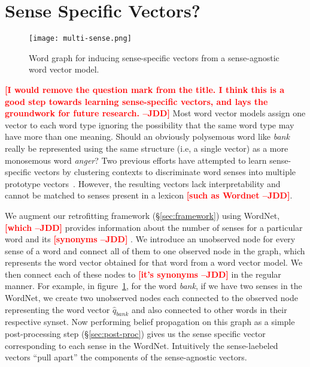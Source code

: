 \documentclass[11pt]{article}
\newcommand{\jdd}[1]{\textcolor{red}{\bf\small [#1 --JDD]}}
\begin{document}
\section{Sense Specific Vectors?}
\label{sec:word-sense}

\begin{figure}[tb]
  \centering
  \texttt{[image: multi-sense.png]}
  \caption{Word graph for inducing sense-specific vectors from a sense-agnostic word vector model.}
  \label{fig:sense-graph}
\end{figure}

\jdd{I would remove the question mark from the title. I think this is a good step towards learning sense-specific vectors, and lays the groundwork for future research.}
Most word vector models assign one vector to each word type
ignoring the possibility that the same word type may have more than one meaning. 
Should an obviously polysemous word like \textit{bank} really be represented using
the same structure (i.e, a single vector) as a more monosemous word \textit{anger}?
Two previous efforts have attempted to learn sense-specific vectors by 
clustering contexts to discriminate
word senses into multiple prototype vectors~\cite{reisinger:naacl10,huang2012improving}. 
However, the resulting vectors
lack interpretability and cannot be matched to senses present in a lexicon \jdd{such as Wordnet}.

We augment our retrofitting framework (\S\ref{sec:framework}) using WordNet, \jdd{which}
 provides information about the number of senses for a particular word
and its \jdd{synonyms} . We introduce an unobserved node for every sense of a 
word and connect all of them to one observed node in the graph, which represents the word
vector obtained for that word from a word vector model. We then connect
each of these nodes to \jdd{it's synonyms} in the regular manner. 
For example, in figure~\ref{fig:sense-graph}, for the word \textit{bank}, 
if we have two senses in the WordNet,
we create two unobserved nodes each connected to the observed node representing
the word vector $\hat{q}_{bank}$ and also connected to other words in their respective 
synset.
Now performing belief propagation on this graph as a simple post-processing step
(\S\ref{sec:post-proc}) gives us the sense specific vector corresponding to each
sense in the WordNet. 
Intuitively the sense-laebeled vectors ``pull apart'' the components of the 
sense-agnostic vectors.
\end{document}
